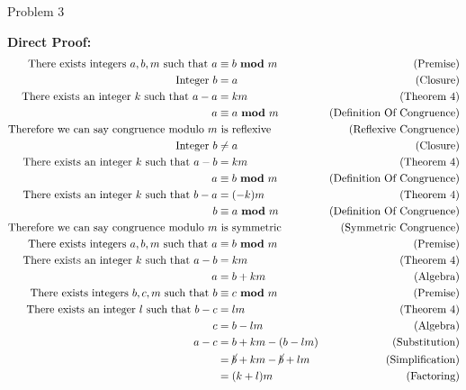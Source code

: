 \begin{problem}{Problem 3}
\begin{Highlight}[Solution]
        \noindent \textbf{Direct Proof:}
        \begin{align*}
            \text{There exists integers } a, b, m \text{ such that } a & \equiv b \modulo m & \text{(Premise)} \\
            \text{Integer } b & = a & \text{(Closure)} \\
            \text{There exists an integer } k \text{ such that } a - a & = km & \text{(Theorem 4)} \\
            a & \equiv a \modulo m & \text{(Definition Of Congruence)} \\
            \text{Therefore we can say congruence modulo } m & \text{ is reflexive} & \text{(Reflexive Congruence)} \\
            \text{Integer } b & \neq a & \text{(Closure)} \\
            \text{There exists an integer } k \text{ such that } a - b & = km & \text{(Theorem 4)} \\
            a & \equiv b \modulo m & \text{(Definition Of Congruence)} \\
            \text{There exists an integer } k \text{ such that } b - a & = (-k)m & \text{(Theorem 4)} \\
            b & \equiv a \modulo m & \text{(Definition Of Congruence)} \\
            \text{Therefore we can say congruence modulo } m & \text{ is symmetric} & \text{(Symmetric Congruence)} \\
            \text{There exists integers } a, b, m \text{ such that } a & \equiv b \modulo m & \text{(Premise)} \\
            \text{There exists an integer } k \text{ such that } a - b & = km & \text{(Theorem 4)} \\
            a & = b + km & \text{(Algebra)} \\
            \text{There exists integers } b, c, m \text{ such that } b & \equiv c \modulo m & \text{(Premise)} \\
            \text{There exists an integer } l \text{ such that } b - c & = lm & \text{(Theorem 4)} \\
            c & = b - lm & \text{(Algebra)} \\
            a - c & = b + km - (b - lm) & \text{(Substitution)} \\
            & = \cancel{b} + km - \cancel{b} + lm & \text{(Simplification)} \\
            & = (k + l)m & \text{(Factoring)} \\

\end{align*}
\end{Highlight}
\end{problem}
